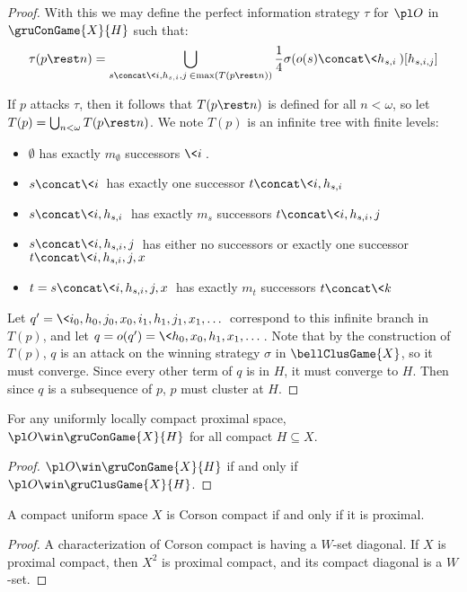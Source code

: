 \begin{proof}
  With this we may define the perfect information strategy $\tau$ for $\pl O$ in $\gruConGame{X}{H}$ such that:
  \[
    \tau(p\rest n) = \bigcup_{s\concat\<i,h_{s,i},j\>\in\max(T(p\rest n))} \frac{1}{4}\sigma(o(s)\concat\<h_{s,i}\>)[h_{s,i,j}]
  \]

  If $p$ attacks $\tau$, then it follows that $T(p\rest n)$ is defined for all $n<\omega$, so let $T(p)=\bigcup_{n<\omega} T(p\rest n)$. We note $T(p)$ is an infinite tree with finite levels:
    \begin{itemize}
      \item $\emptyset$ has exactly $m_\emptyset$ successors $\<i\>$.
      \item $s\concat\<i\>$ has exactly one successor $t\concat\<i,h_{s,i}\>$
      \item $s\concat\<i,h_{s,i}\>$ has exactly $m_s$ successors $t\concat\<i,h_{s,i},j\>$
      \item $s\concat\<i,h_{s,i},j\>$ has either no successors or exactly one successor $t\concat\<i,h_{s,i},j,x\>$
      \item $t=s\concat\<i,h_{s,i},j,x\>$ has exactly $m_t$ successors $t\concat\<k\>$
    \end{itemize}

  Let $q'=\<i_0,h_0,j_0,x_0,i_1,h_1,j_1,x_1,\dots\>$ correspond to this infinite branch in $T(p)$, and let $q=o(q')=\<h_0,x_0,h_1,x_1,\dots\>$. Note that by the construction of $T(p)$, $q$ is an attack on the winning strategy $\sigma$ in $\bellClusGame{X}$, so it must converge. Since every other term of $q$ is in $H$, it must converge to $H$. Then since $q$ is a subsequence of $p$, $p$ must cluster at $H$.
\end{proof}


\begin{cor}
  For any uniformly locally compact proximal space, $\pl O\win \gruConGame{X}{H}$ for all compact $H\subseteq X$.
\end{cor}

\begin{proof}
  $\pl O \win \gruConGame{X}{H}$ if and only if $\pl O \win \gruClusGame{X}{H}$.
\end{proof}

\begin{cor}
  A compact uniform space $X$ is Corson compact if and only if it is proximal.
\end{cor}

\begin{proof}
  A characterization of Corson compact is having a $W$-set diagonal. If $X$ is proximal compact, then $X^2$ is proximal compact, and its compact diagonal is a $W$-set.
\end{proof}









